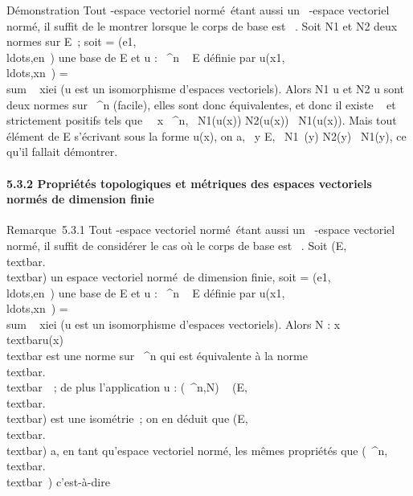 Démonstration Tout -espace vectoriel normé~étant aussi un ~-espace
vectoriel normé, il suffit de le montrer lorsque le corps de base est ~.
Soit N1 et N2 deux normes sur E~; soit  =
(e1,\\ldots,en~)
une base de E et u : ~^n \rightarrow~ E définie par
u(x1,\\ldots,xn~)
= \\sum ~
xiei (u est un isomorphisme d'espaces vectoriels).
Alors N1 \cdot u et N2 \cdot u sont deux normes sur
~^n (facile), elles sont donc équivalentes, et donc il existe
\alpha~ et \beta~ strictement positifs tels que \forall~~x \in
{}~^n, \alpha~N1(u(x)) \leq N2(u(x)) \leq
\beta~N1(u(x)). Mais tout élément de E s'écrivant sous la forme
u(x), on a, \forall~y \in E, \alpha~N1~(y) \leq
N2(y) \leq \beta~N1(y), ce qu'il fallait démontrer.

\paragraph{5.3.2 Propriétés topologiques et métriques des espaces
vectoriels normés de dimension finie}

Remarque~5.3.1 Tout -espace vectoriel normé~étant aussi un ~-espace
vectoriel normé, il suffit de considérer le cas où le corps de base est
~. Soit (E,\\textbar{}.\\textbar{}) un
espace vectoriel normé~de dimension finie, soit  =
(e1,\\ldots,en~)
une base de E et u : ~^n \rightarrow~ E définie par
u(x1,\\ldots,xn~)
= \\sum ~
xiei (u est un isomorphisme d'espaces vectoriels).
Alors N :
x\mapsto~\\textbar{}u(x)\\textbar{}
est une norme sur ~^n qui est équivalente à la norme
\\textbar{}.\\textbar{}\infty~~; de
plus l'application u : (~^n,N) \rightarrow~
(E,\\textbar{}.\\textbar{}) est une
isométrie~; on en déduit que
(E,\\textbar{}.\\textbar{}) a, en tant
qu'espace vectoriel normé, les mêmes propriétés que
(~^n,\\textbar{}.\\textbar{}\infty~)
c'est-à-dire

